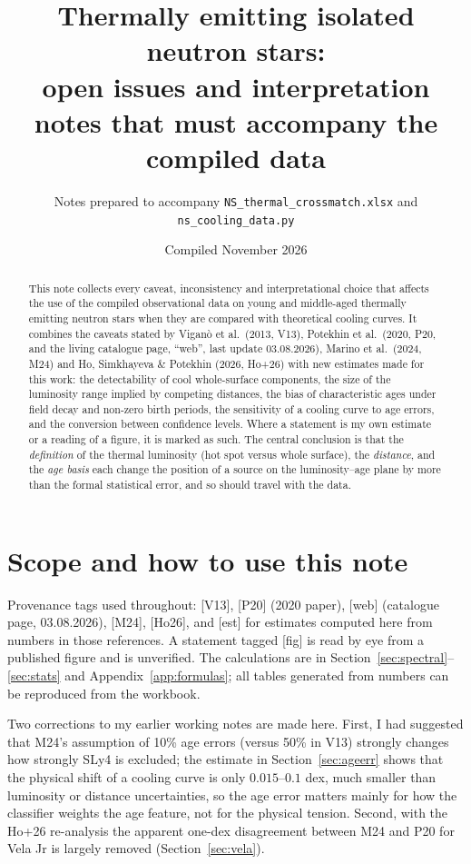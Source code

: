 \documentclass[11pt,a4paper]{article}
\title{Thermally emitting isolated neutron stars: \\ open issues and interpretation notes that must accompany the compiled data}
\author{Notes prepared to accompany \texttt{NS\_thermal\_crossmatch.xlsx} and \texttt{ns\_cooling\_data.py}}
\date{Compiled November 2026}
\newcommand{\src}[1]{\textsf{[#1]}}
\begin{document}
\maketitle

\begin{abstract}
\noindent
This note collects every caveat, inconsistency and interpretational choice that affects the use of the compiled observational data on young and middle-aged thermally emitting neutron stars when they are compared with theoretical cooling curves. It combines the caveats stated by Vigan\`o et al.\ (2013, V13), Potekhin et al.\ (2020, P20, and the living catalogue page, ``web'', last update 03.08.2026), Marino et al.\ (2024, M24) and Ho, Simkhayeva \& Potekhin (2026, Ho+26) with new estimates made for this work: the detectability of cool whole-surface components, the size of the luminosity range implied by competing distances, the bias of characteristic ages under field decay and non-zero birth periods, the sensitivity of a cooling curve to age errors, and the conversion between confidence levels. Where a statement is my own estimate or a reading of a figure, it is marked as such. The central conclusion is that the \emph{definition} of the thermal luminosity (hot spot versus whole surface), the \emph{distance}, and the \emph{age basis} each change the position of a source on the luminosity--age plane by more than the formal statistical error, and so should travel with the data.
\end{abstract}

\tableofcontents

\section{Scope and how to use this note}
Provenance tags used throughout: \src{V13}, \src{P20} (2020 paper), \src{web} (catalogue page, 03.08.2026), \src{M24}, \src{Ho26}, and \src{est} for estimates computed here from numbers in those references. A statement tagged \src{fig} is read by eye from a published figure and is unverified. The calculations are in Section~\ref{sec:spectral}--\ref{sec:stats} and Appendix~\ref{app:formulas}; all tables generated from numbers can be reproduced from the workbook.

Two corrections to my earlier working notes are made here. First, I had suggested that M24's assumption of 10\% age errors (versus 50\% in V13) strongly changes how strongly SLy4 is excluded; the estimate in Section~\ref{sec:ageerr} shows that the physical shift of a cooling curve is only $0.015$--$0.1$ dex, much smaller than luminosity or distance uncertainties, so the age error matters mainly for how the classifier weights the age feature, not for the physical tension. Second, with the Ho+26 re-analysis the apparent one-dex disagreement between M24 and P20 for Vela Jr is largely removed (Section~\ref{sec:vela}).
\end{document}
